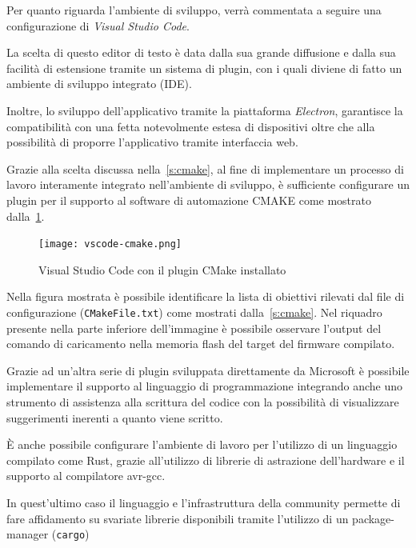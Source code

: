 Per quanto riguarda l'ambiente di sviluppo, verrà commentata a seguire una configurazione di \textit{Visual Studio Code}.

La scelta di questo editor di testo è data dalla sua grande diffusione\cite{site:vscode-connect-2017} e dalla sua facilità di estensione tramite un sistema di plugin, con i quali diviene di fatto un ambiente di sviluppo integrato (IDE).

Inoltre, lo sviluppo dell'applicativo tramite la piattaforma \textit{Electron}\cite{site:vscode-about}, garantisce la compatibilità con una fetta notevolmente estesa di dispositivi oltre che alla possibilità di proporre l'applicativo tramite interfaccia web\cite{site:electron}. 

Grazie alla scelta discussa nella~\cref{s:cmake}, al fine di implementare un processo di lavoro interamente integrato nell'ambiente di sviluppo, è sufficiente configurare un plugin per il supporto al software di automazione CMAKE come mostrato dalla~\cref{fig:vscode-cmake-plugin}.\@

\begin{figure}
    \centering
    \texttt{[image: vscode-cmake.png]}
    \caption[Immagine del software Visual Studio Code]{Visual Studio Code con il plugin CMake installato}\label{fig:vscode-cmake-plugin}
\end{figure}

Nella figura mostrata è possibile identificare la lista di obiettivi rilevati dal file di configurazione (\texttt{CMakeFile.txt}) come mostrati dalla~\cref{s:cmake}. Nel riquadro presente nella parte inferiore dell'immagine è possibile osservare l'output del comando di caricamento nella memoria flash del target del firmware compilato.

Grazie ad un'altra serie di plugin sviluppata direttamente da Microsoft è possibile implementare il supporto al linguaggio di programmazione integrando anche uno strumento di assistenza alla scrittura del codice con la possibilità di visualizzare suggerimenti inerenti a quanto viene scritto.

È anche possibile configurare l'ambiente di lavoro per l'utilizzo di un linguaggio compilato come Rust\cite{site:avrrust}, grazie all'utilizzo di librerie di astrazione dell'hardware\cite{site:arduino-hal-rust} e il supporto al compilatore avr-gcc.

In quest'ultimo caso il linguaggio e l'infrastruttura della community permette di fare affidamento su svariate librerie disponibili tramite l'utilizzo di un package-manager (\texttt{cargo}\cite{site:cargo-book})

